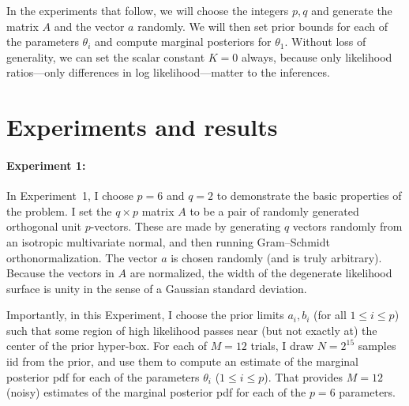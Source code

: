 \documentclass[10pt]{article}
\begin{document}
In the experiments that follow, we will choose the integers $p, q$ and generate the matrix $A$ and the vector $a$ randomly.
We will then set prior bounds for each of the parameters $\theta_i$ and compute marginal posteriors for $\theta_1$.
Without loss of generality, we can set the scalar constant $K=0$ always, because only likelihood ratios---only differences in log likelihood---matter to the inferences.

\section{Experiments and results}
\paragraph{Experiment 1:}
In Experiment~1, I choose $p=6$ and $q=2$ to demonstrate the basic properties of the problem.
I set the $q\times p$ matrix $A$ to be a pair of randomly generated orthogonal unit $p$-vectors.
These are made by generating $q$ vectors randomly from an isotropic multivariate normal, and then running Gram--Schmidt orthonormalization.
The vector $a$ is chosen randomly (and is truly arbitrary).
Because the vectors in $A$ are normalized, the width of the degenerate likelihood surface is unity in the sense of a Gaussian standard deviation.

Importantly, in this Experiment, I choose the prior limits $a_i, b_i$ (for all $1\leq i\leq p$) such that some region of high likelihood passes near (but not exactly at) the center of the prior hyper-box.
For each of $M=12$ trials, I draw $N=2^15$ samples iid from the prior, and use them to compute an estimate of the marginal posterior pdf for each of the parameters $\theta_i$ ($1\leq i\leq p$).
That provides $M=12$ (noisy) estimates of the marginal posterior pdf for each of the $p=6$ parameters.
\end{document}
